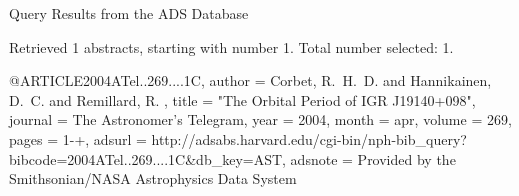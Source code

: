 Query Results from the ADS Database


Retrieved 1 abstracts, starting with number 1.  Total number selected: 1.

@ARTICLE{2004ATel..269....1C,
   author = {{Corbet}, R.~H.~D. and {Hannikainen}, D.~C. and {Remillard}, R.
	},
    title = "{The Orbital Period of IGR J19140+098}",
  journal = {The Astronomer's Telegram},
     year = 2004,
    month = apr,
   volume = 269,
    pages = {1-+},
   adsurl = {http://adsabs.harvard.edu/cgi-bin/nph-bib_query?bibcode=2004ATel..269....1C&db_key=AST},
  adsnote = {Provided by the Smithsonian/NASA Astrophysics Data System}
}


